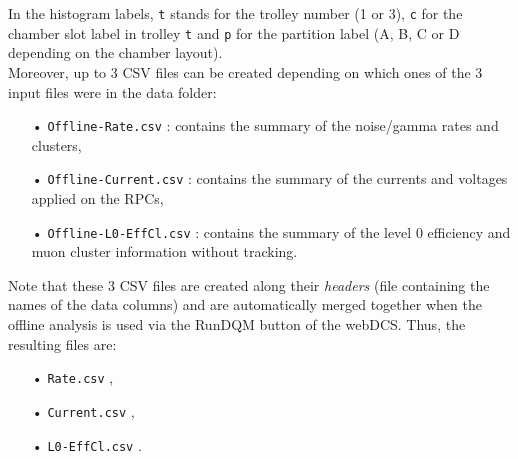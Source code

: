 	In the histogram labels, \verb+t+ stands for the trolley number (1 or 3), \verb+c+ for the chamber slot label in trolley \verb+t+ and \verb+p+ for the partition label (A, B, C or D depending on the chamber layout).\\

	Moreover, up to 3 CSV files can be created depending on which ones of the 3 input files were in the data folder:

	\begin{itemize}
		\item[•] \verb+Offline-Rate.csv+ : contains the summary of the noise/gamma rates and clusters,
		\item[•] \verb+Offline-Current.csv+ : contains the summary of the currents and voltages applied on the RPCs,
		\item[•] \verb+Offline-L0-EffCl.csv+ : contains the summary of the level 0 efficiency and muon cluster information without tracking.
	\end{itemize}
	
	Note that these 3 CSV files are created along their \textit{headers} (file containing the names of the data columns) and are automatically merged together when the offline analysis is used via the RunDQM button of the webDCS. Thus, the resulting files are:

	\begin{itemize}
		\item[•] \verb+Rate.csv+ ,
		\item[•] \verb+Current.csv+ ,
		\item[•] \verb+L0-EffCl.csv+ .
	\end{itemize}

\clearpage{\pagestyle{empty}\cleardoublepage}